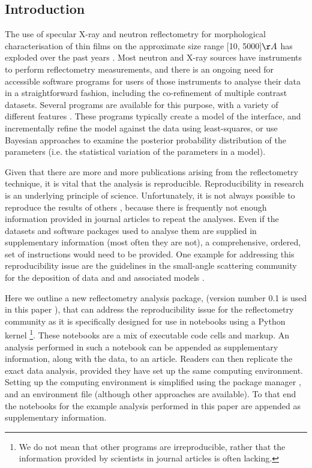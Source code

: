 \documentclass[12pt]{article}
\begin{document}
\subsection*{Introduction}
The use of specular X-ray and neutron reflectometry for morphological characterisation of thin films on the approximate size range [10, 5000]$\AA$ has exploded over the past years \cite{Wood2017, Daillant2009}. Most neutron and X-ray sources have instruments to perform reflectometry measurements, and there is an ongoing need for accessible software programs for users of those instruments to analyse their data in a straightforward fashion, including the co-refinement of multiple contrast datasets.  Several programs are available for this purpose, with a variety of different features \cite{Bjorck2007, Gerelli2016, Kienzle2011, Nelson2006}. These programs typically create a model of the interface, and incrementally refine the model against the data using least-squares, or use Bayesian approaches \cite{Sivia2006, 2010arXiv1008.4686H} to examine the posterior probability distribution of the parameters (i.e. the statistical variation of the parameters in a model).

Given that there are more and more publications arising from the reflectometry technique, it is vital that the analysis is reproducible. Reproducibility in research is an underlying principle of science. Unfortunately, it is not always possible to reproduce the results of others \cite{Stark2018}, because there is frequently not enough information provided in journal articles to repeat the analyses. Even if the datasets and software packages used to analyse them are supplied in supplementary information (most often they are not), a comprehensive, ordered, set of instructions would need to be provided.
One example for addressing this reproducibility issue are the guidelines in the small-angle scattering community for the deposition of data and and associated models \cite{Trewhella:jc5010}.

Here we outline a new reflectometry analysis package,  (version number 0.1 is used in this paper \cite{refnx}), that can address the reproducibility issue for the reflectometry community as it is specifically designed for use in \Jupyter notebooks \cite{Kluyver:2016aa} using a Python kernel \footnote{We do not mean that other programs are irreproducible, rather that the information provided by scientists in journal articles is often lacking.}.
These notebooks are a mix of executable code cells and markup. An analysis performed in such a notebook can be appended as supplementary information, along with the data, to an article. Readers can then replicate the exact data analysis, provided they have set up the same computing environment. Setting up the computing environment is simplified using the \conda package manager \cite{conda}, and an environment file (although other approaches are available). To that end the \Jupyter notebooks for the example analysis performed in this paper are appended as supplementary information.
\end{document}
